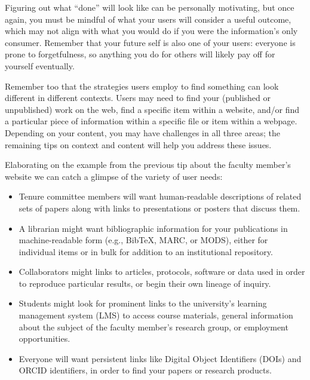 \documentclass[10pt,letterpaper]{article}
\begin{document}
Figuring out what ``done'' will look like can be personally motivating, but once
again, you must be mindful of what your users will consider a useful outcome, which
may not align with what you would do if you were the information's only consumer.
Remember that your future self is also one of your users: everyone is prone to 
forgetfulness, so anything you do for others will likely pay off for yourself
eventually\cite{Briney2015}.

Remember too that the strategies users employ to find something can look different 
in different contexts. Users may need to find your (published or unpublished)
work on the web, find a specific item within a website, and/or find a particular 
piece of information within a specific file or item within a webpage. Depending on 
your content, you may have challenges in all three areas; the remaining tips on 
context and content will help you address these issues.

Elaborating on the example from the previous tip about the faculty member's website 
we can catch a glimpse of the variety of user needs:

\begin{itemize}

\item
  Tenure committee members will want human-readable descriptions of related sets
  of papers along with links to presentations or posters that discuss them.
 
\item
  A librarian might want bibliographic information for your publications in
  machine-readable form (e.g., BibTeX, MARC, or MODS), either for individual
  items or in bulk for addition to an institutional repository.

\item

  Collaborators might links to articles, protocols, software or 
  data used in order to reproduce particular results, or begin
  their own lineage of inquiry.

\item
  Students might look for prominent links to the university's learning management
  system (LMS) to access course materials, general information about the subject 
  of the faculty member's research group, or employment opportunities. 
  
  \item
  Everyone will want persistent links like Digital Object Identifiers (DOIs) \cite{DOI2020} 
  and ORCID \cite{ORCID2020} identifiers, in order to find your papers or research products.

\end{itemize}
\end{document}

